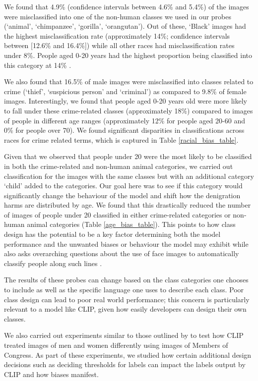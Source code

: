 We found that 4.9\% (confidence intervals between 4.6\% and 5.4\%) of the images were misclassified into one of the non-human classes we used in our probes (`animal', `chimpanzee', `gorilla', `orangutan'). Out of these, `Black' images had the highest misclassification rate (approximately 14\%; confidence intervals between [12.6\% and 16.4\%]) while all other races had misclassification rates under 8\%. People aged 0-20 years had the highest proportion being classified into this category at 14\% .

We also found that 16.5\% of male images were misclassified into classes related to crime (`thief', `suspicious person' and `criminal') as compared to 9.8\% of female images. Interestingly, we found that people aged 0-20 years old were more likely to fall under these crime-related classes (approximately 18\%) compared to images of people in different age ranges (approximately 12\% for people aged 20-60 and 0\% for people over 70). We found significant disparities in classifications across races for crime related terms, which is captured in Table \ref{racial_bias_table}. 

Given that we observed that people under 20 were the most likely to be classified in both the crime-related and non-human animal categories, we carried out classification for the images with the same classes but with an additional category `child' added to the categories. Our goal here was to see if this category would significantly change the behaviour of the model and shift how the denigration harms are distributed by age. We found that this drastically reduced the number of images of people under 20 classified in either crime-related categories or non-human animal categories (Table \ref{age_bias_table}). This points to how class design has the potential to be a key factor determining both the model performance and the unwanted biases or behaviour the model may exhibit while also asks overarching questions about the use of face images to automatically classify people along such lines \citep{Arcas2017}. 

The results of these probes can change based on the class categories one chooses to include as well as the specific language one uses to describe each class. Poor class design can lead to poor real world performance; this concern is particularly relevant to a model like CLIP, given how easily developers can design their own classes. 

We also carried out experiments similar to those outlined by \citet{schwemmer2020diagnosing} to test how CLIP treated images of men and women differently using images of Members of Congress. As part of these experiments, we studied how certain additional design decisions such as deciding thresholds for labels can impact the labels output by CLIP and how biases manifest. 

